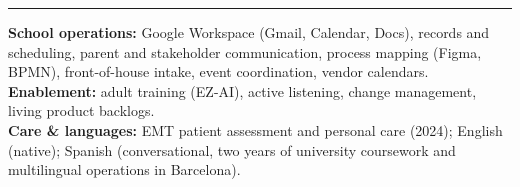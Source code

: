 \documentclass[10pt,letterpaper]{article}
\newcommand{\cvsection}[1]{%
  \vspace{7pt}%
  \noindent{\bfseries\fontsize{11pt}{13pt}\selectfont\MakeUppercase{#1}}\par
  \vspace{1pt}%
  \noindent\rule{\textwidth}{0.4pt}\par
  \vspace{4pt}%
}
\begin{document}
\cvsection{Skills}

{\raggedright
\noindent\textbf{School operations:} Google Workspace (Gmail, Calendar, Docs), records and scheduling, parent and stakeholder communication, process mapping (Figma, BPMN), front-of-house intake, event coordination, vendor calendars.\\[2pt]
\noindent\textbf{Enablement:} adult training (EZ-AI), active listening, change management, living product backlogs.\\[2pt]
\noindent\textbf{Care \& languages:} EMT patient assessment and personal care (2024); English (native); Spanish (conversational, two years of university coursework and multilingual operations in Barcelona).\par
}
\end{document}
